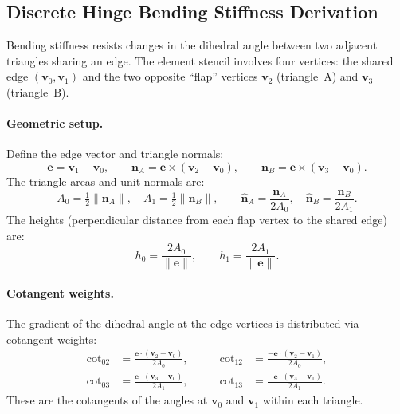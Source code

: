 \subsection{Discrete Hinge Bending Stiffness Derivation}

Bending stiffness resists changes in the dihedral angle between two adjacent triangles sharing an edge. The element stencil involves four vertices: the shared edge $(\mathbf{v}_0, \mathbf{v}_1)$ and the two opposite ``flap'' vertices $\mathbf{v}_2$ (triangle~A) and $\mathbf{v}_3$ (triangle~B).

\paragraph{Geometric setup.}
Define the edge vector and triangle normals:
\begin{equation}
  \mathbf{e} = \mathbf{v}_1 - \mathbf{v}_0, \qquad
  \mathbf{n}_A = \mathbf{e} \times (\mathbf{v}_2 - \mathbf{v}_0), \qquad
  \mathbf{n}_B = \mathbf{e} \times (\mathbf{v}_3 - \mathbf{v}_0).
\end{equation}
The triangle areas and unit normals are:
\begin{equation}
  A_0 = \tfrac{1}{2}\|\mathbf{n}_A\|, \quad
  A_1 = \tfrac{1}{2}\|\mathbf{n}_B\|, \qquad
  \hat{\mathbf{n}}_A = \frac{\mathbf{n}_A}{2 A_0}, \quad
  \hat{\mathbf{n}}_B = \frac{\mathbf{n}_B}{2 A_1}.
\end{equation}
The heights (perpendicular distance from each flap vertex to the shared edge) are:
\begin{equation}
  h_0 = \frac{2 A_0}{\|\mathbf{e}\|}, \qquad
  h_1 = \frac{2 A_1}{\|\mathbf{e}\|}.
\end{equation}

\paragraph{Cotangent weights.}
The gradient of the dihedral angle at the edge vertices is distributed via cotangent weights:
\begin{equation}
  \begin{aligned}
    \cot_{02} &= \frac{\mathbf{e} \cdot (\mathbf{v}_2 - \mathbf{v}_0)}{2 A_0}, &\qquad
    \cot_{12} &= \frac{-\mathbf{e} \cdot (\mathbf{v}_2 - \mathbf{v}_1)}{2 A_0}, \\[4pt]
    \cot_{03} &= \frac{\mathbf{e} \cdot (\mathbf{v}_3 - \mathbf{v}_0)}{2 A_1}, &\qquad
    \cot_{13} &= \frac{-\mathbf{e} \cdot (\mathbf{v}_3 - \mathbf{v}_1)}{2 A_1}.
  \end{aligned}
\end{equation}
These are the cotangents of the angles at $\mathbf{v}_0$ and $\mathbf{v}_1$ within each triangle.

